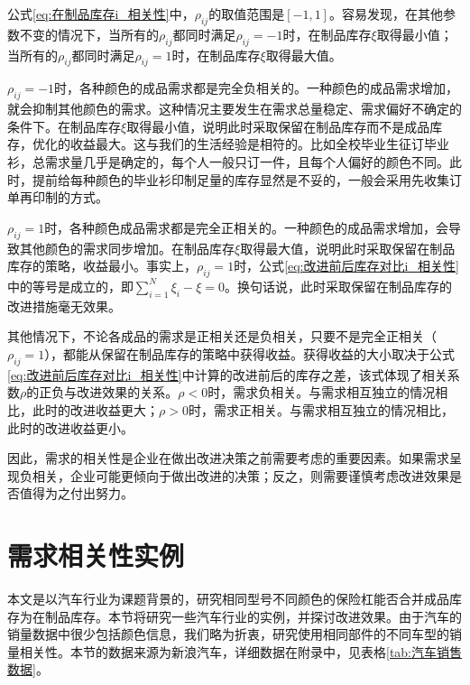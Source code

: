 公式\ref{eq:在制品库存i_相关性}中，$\rho_{ij}$的取值范围是$[-1,1]$。容易发现，在其他参数不变的情况下，当所有的$\rho_{ij}$都同时满足$\rho_{ij}=-1$时，在制品库存$\xi$取得最小值；当所有的$\rho_{ij}$都同时满足$\rho_{ij}=1$时，在制品库存$\xi$取得最大值。

$\rho_{ij}=-1$时，各种颜色的成品需求都是完全负相关的。一种颜色的成品需求增加，就会抑制其他颜色的需求。这种情况主要发生在需求总量稳定、需求偏好不确定的条件下。在制品库存$\xi$取得最小值，说明此时采取保留在制品库存而不是成品库存，优化的收益最大。这与我们的生活经验是相符的。比如全校毕业生征订毕业衫，总需求量几乎是确定的，每个人一般只订一件，且每个人偏好的颜色不同。此时，提前给每种颜色的毕业衫印制足量的库存显然是不妥的，一般会采用先收集订单再印制的方式。

$\rho_{ij}=1$时，各种颜色成品需求都是完全正相关的。一种颜色的成品需求增加，会导致其他颜色的需求同步增加。在制品库存$\xi$取得最大值，说明此时采取保留在制品库存的策略，收益最小。事实上，$\rho_{ij}=1$时，公式\ref{eq:改进前后库存对比i_相关性}中的等号是成立的，即$\sum_{i=1}^N\xi_i - \xi = 0$。换句话说，此时采取保留在制品库存的改进措施毫无效果。

其他情况下，不论各成品的需求是正相关还是负相关，只要不是完全正相关（$\rho_{ij}=1$），都能从保留在制品库存的策略中获得收益。获得收益的大小取决于公式\ref{eq:改进前后库存对比i_相关性}中计算的改进前后的库存之差，该式体现了相关系数$\rho$的正负与改进效果的关系。$\rho < 0$时，需求负相关。与需求相互独立的情况相比，此时的改进收益更大；$\rho > 0$时，需求正相关。与需求相互独立的情况相比，此时的改进收益更小。

因此，需求的相关性是企业在做出改进决策之前需要考虑的重要因素。如果需求呈现负相关，企业可能更倾向于做出改进的决策；反之，则需要谨慎考虑改进效果是否值得为之付出努力。
















\section{需求相关性实例}

本文是以汽车行业为课题背景的，研究相同型号不同颜色的保险杠能否合并成品库存为在制品库存。本节将研究一些汽车行业的实例，并探讨改进效果。由于汽车的销量数据中很少包括颜色信息，我们略为折衷，研究使用相同部件的不同车型的销量相关性。本节的数据来源为新浪汽车\cite{__????}\cite{__????-1}，详细数据在附录中，见表格\ref{tab:汽车销售数据}。

